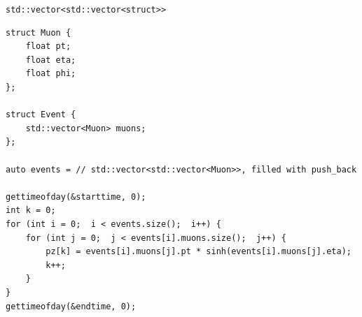 \documentclass[aspectratio=169]{beamer}
\begin{document}
\begin{frame}[fragile]{{\tt std::vector<std::vector<struct>>}}
\vspace{0.3 cm}
\scriptsize
\begin{verbatim}
struct Muon {
    float pt;
    float eta;
    float phi;
};

struct Event {
    std::vector<Muon> muons;
};

auto events = // std::vector<std::vector<Muon>>, filled with push_back

gettimeofday(&starttime, 0);
int k = 0;
for (int i = 0;  i < events.size();  i++) {
    for (int j = 0;  j < events[i].muons.size();  j++) {
        pz[k] = events[i].muons[j].pt * sinh(events[i].muons[j].eta);
        k++;
    }
}
gettimeofday(&endtime, 0);
\end{verbatim}
\end{frame}
\end{document}
